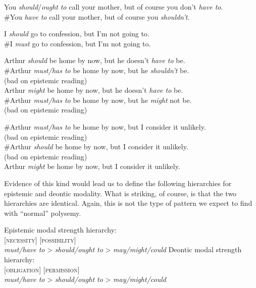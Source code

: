 \ea \label{ex:16.6}
\ea  You \textit{should}/\textit{ought} \textit{to} call your mother, but of course you don’t \textit{have to}.\\
\ex \#You \textit{have to} call your mother, but of course you \textit{shouldn’t}.
\z \z

\ea \label{ex:16.7}
\ea  I \textit{should} go to confession, but I’m not going to.\\
\ex \#I \textit{must} go to confession, but I’m not going to.
                       \z
\z


\ea \label{ex:16.8}
\ea  Arthur \textit{should} be home by now, but he doesn’t \textit{have to} be.\\
\ex \#Arthur \textit{must/has to} be home by now, but he \textit{shouldn’t} be.\\
  (bad on epistemic reading)\\
\ex Arthur \textit{might} be home by now, but he doesn’t \textit{have to} be.\\
\ex \#Arthur \textit{must/has to} be home by now, but he \textit{might} not be.\\
  (bad on epistemic reading)
                       \z
\z

\ea \label{ex:16.9}
\ea  \#Arthur \textit{must/has to} be home by now, but I consider it unlikely.\\
  (bad on epistemic reading)\\
\ex \#Arthur \textit{should} be home by now, but I consider it unlikely.\\
  (bad on epistemic reading)\\
\ex Arthur \textit{might} be home by now, but I consider it unlikely.
                       \z
\z


Evidence of this kind would lead us to define the following hierarchies for epistemic and deontic modality. What is striking, of course, is that the two hierarchies are identical. Again, this is not the type of pattern we expect to find with “normal” polysemy.


\ea \label{ex:16.10}
\ea Epistemic modal strength hierarchy:\\
{}[\textsc{necessity}] \hfill [\textsc{possibility}] \\
\hspace{1cm} \textit{must/have to} > \textit{should/ought to} > \textit{may/might/could}  
\ex  Deontic modal strength hierarchy:\\
{}[\textsc{obligation}] \hfill  [\textsc{permission}]\\
\hspace{1cm} \textit{must/have to} > \textit{should/ought to} > \textit{may/might/could} 
\z \z


